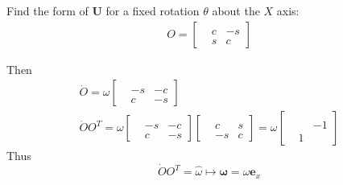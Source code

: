 Find the form of $\mathbf{U}$ for a fixed rotation $\theta$ about the $X$ axis: 
\[
\begin{gathered}
	O = \left[ \begin{matrix} & & \\ & c & -s \\ & s & c \end{matrix} \right]
\end{gathered}
\]

Then
\[
\begin{gathered}
	\dot{O} = \omega \left[ \begin{matrix} & & \\ & -s & -c \\ & c & -s \end{matrix} \right] \\
	\dot{O}O^T = \omega \left[ \begin{matrix} & & \\ & -s & -c \\ & c & -s \end{matrix} \right] \left[ \begin{matrix} & & \\ & c & s \\ & -s & c \end{matrix} \right] = \omega \left[ \begin{matrix} & & \\ & & -1 \\ & 1 & \end{matrix} \right] 
\end{gathered}
\]
Thus 
\[
\dot{O}O^T = \widehat{\omega} \mapsto \mathbf{\omega} = \omega \mathbf{e}_x
\]

